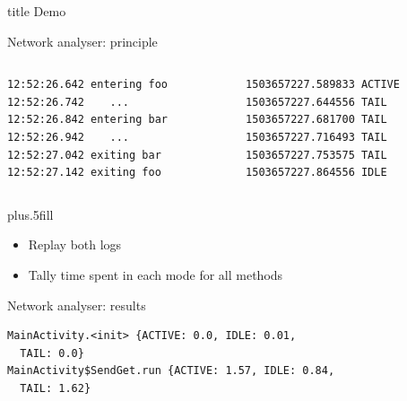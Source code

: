 %
% 
\begin{frame}
  \vfill
  \centering
  \begin{beamercolorbox}[sep=8pt,center,shadow=true,rounded=true]{title}
    Demo\par%
  \end{beamercolorbox}
  \vfill
{}
\end{frame}
%
%
\begin{frame}[fragile]{Network analyser: principle}
\begin{columns}
\begin{column}{0.5\textwidth}
\begin{lstlisting}
12:52:26.642 entering foo
12:52:26.742 	...
12:52:26.842 entering bar
12:52:26.942 	...
12:52:27.042 exiting bar
12:52:27.142 exiting foo
\end{lstlisting}
\end{column}
\begin{column}{0.5\textwidth}
\begin{lstlisting}
1503657227.589833 ACTIVE
1503657227.644556 TAIL
1503657227.681700 TAIL
1503657227.716493 TAIL
1503657227.753575 TAIL
1503657227.864556 IDLE
\end{lstlisting}
\end{column}
\end{columns}
\vskip0pt plus.5fill
\begin{itemize}
\item Replay both logs
\item Tally time spent in each mode for all methods
\end{itemize}
\end{frame}
%
%
\begin{frame}[fragile]{Network analyser: results}
\begin{lstlisting}
MainActivity.<init> {ACTIVE: 0.0, IDLE: 0.01,
  TAIL: 0.0}
MainActivity$SendGet.run {ACTIVE: 1.57, IDLE: 0.84,
  TAIL: 1.62}
\end{lstlisting}
\end{frame}
%
%
